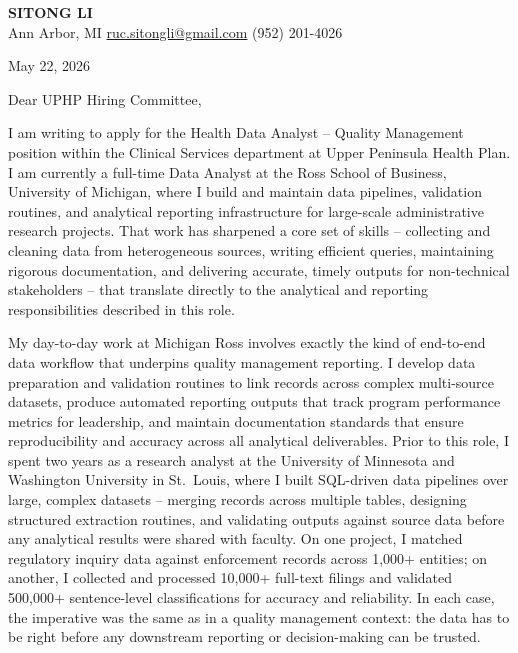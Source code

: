 \documentclass[12pt]{article}
\begin{document}
\begin{center}
  {\LARGE\textbf{\textcolor{accent}{SITONG LI}}} \\[4pt]
  \small Ann Arbor, MI
  \;\textbullet\;
  \href{mailto:ruc.sitongli@gmail.com}{ruc.sitongli@gmail.com}
  \;\textbullet\;
  (952) 201-4026
\end{center}

\vspace{1em}

\noindent May 22, 2026

\vspace{1em}

\noindent Dear UPHP Hiring Committee,

\vspace{1em}

I am writing to apply for the Health Data Analyst -- Quality Management position within the Clinical Services department at Upper Peninsula Health Plan. I am currently a full-time Data Analyst at the Ross School of Business, University of Michigan, where I build and maintain data pipelines, validation routines, and analytical reporting infrastructure for large-scale administrative research projects. That work has sharpened a core set of skills -- collecting and cleaning data from heterogeneous sources, writing efficient queries, maintaining rigorous documentation, and delivering accurate, timely outputs for non-technical stakeholders -- that translate directly to the analytical and reporting responsibilities described in this role.

My day-to-day work at Michigan Ross involves exactly the kind of end-to-end data workflow that underpins quality management reporting. I develop data preparation and validation routines to link records across complex multi-source datasets, produce automated reporting outputs that track program performance metrics for leadership, and maintain documentation standards that ensure reproducibility and accuracy across all analytical deliverables. Prior to this role, I spent two years as a research analyst at the University of Minnesota and Washington University in St.\ Louis, where I built SQL-driven data pipelines over large, complex datasets -- merging records across multiple tables, designing structured extraction routines, and validating outputs against source data before any analytical results were shared with faculty. On one project, I matched regulatory inquiry data against enforcement records across 1,000+ entities; on another, I collected and processed 10,000+ full-text filings and validated 500,000+ sentence-level classifications for accuracy and reliability. In each case, the imperative was the same as in a quality management context: the data has to be right before any downstream reporting or decision-making can be trusted.
\end{document}
